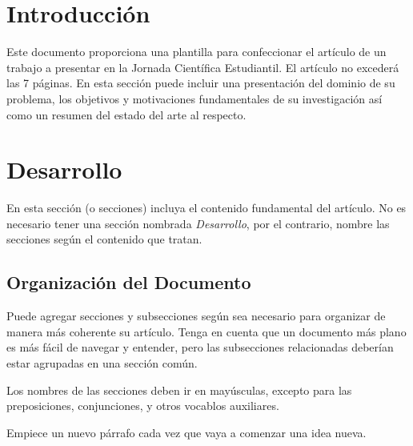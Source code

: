 \documentclass[a4paper,10pt,twocolumn]{article}
\begin{document}
\section{Introducción}\label{sec:intro}
  Este documento proporciona una plantilla para confeccionar el artículo de un 
  trabajo a presentar en la Jornada Científica Estudiantil. El artículo no excederá 
  las 7 páginas. En esta sección puede incluir una presentación del dominio de su 
  problema, los objetivos y motivaciones fundamentales de su investigación así como 
  un resumen del estado del arte al respecto.




\section{Desarrollo}\label{sec:dev}
  En esta sección (o secciones) incluya el contenido fundamental del artículo.
  No es necesario tener una sección nombrada \emph{Desarrollo}, por el contrario,
  nombre las secciones según el contenido que tratan.

	\subsection{Organización del Documento}\label{sub:results}
		Puede agregar secciones y subsecciones según sea necesario para organizar
		de manera más coherente su artículo. Tenga en cuenta que un documento más
		plano es más fácil de navegar y entender, pero las subsecciones relacionadas
		deberían estar agrupadas en una sección común.

		Los nombres de las secciones deben ir en mayúsculas, excepto para las
		preposiciones, conjunciones, y otros vocablos auxiliares.

		Empiece un nuevo párrafo cada vez que vaya a comenzar una idea nueva.

\end{document}
